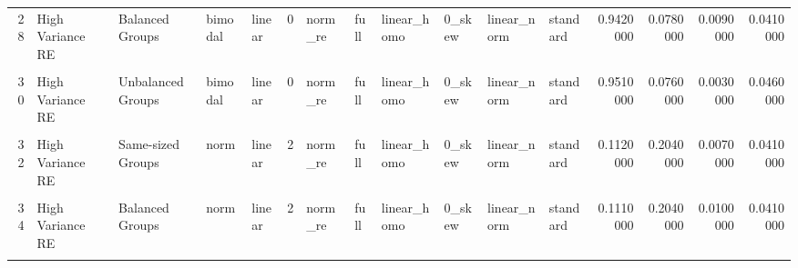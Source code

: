 \documentclass[12pt]{article}
\begin{document}
\begin{table}
{\begin{tabular}[t]{rllllrllllllrrrr}
28 & High Variance RE & Balanced Groups & bimodal & linear & 0 & norm\_re & full & linear\_homo & 0\_skew & linear\_norm & standard & 0.9420000 & 0.0780000 & 0.0090000 & 0.0410000\\
\cellcolor{gray!6}{29} & \cellcolor{gray!6}{High Variance Error} & \cellcolor{gray!6}{Unbalanced Groups} & \cellcolor{gray!6}{bimodal} & \cellcolor{gray!6}{linear} & \cellcolor{gray!6}{0} & \cellcolor{gray!6}{norm\_re} & \cellcolor{gray!6}{full} & \cellcolor{gray!6}{linear\_homo} & \cellcolor{gray!6}{0\_skew} & \cellcolor{gray!6}{linear\_norm} & \cellcolor{gray!6}{standard} & \cellcolor{gray!6}{0.0470000} & \cellcolor{gray!6}{0.0970000} & \cellcolor{gray!6}{0.0950000} & \cellcolor{gray!6}{0.0510000}\\
30 & High Variance RE & Unbalanced Groups & bimodal & linear & 0 & norm\_re & full & linear\_homo & 0\_skew & linear\_norm & standard & 0.9510000 & 0.0760000 & 0.0030000 & 0.0460000\\
\addlinespace
\cellcolor{gray!6}{31} & \cellcolor{gray!6}{High Variance Error} & \cellcolor{gray!6}{Same-sized Groups} & \cellcolor{gray!6}{norm} & \cellcolor{gray!6}{linear} & \cellcolor{gray!6}{2} & \cellcolor{gray!6}{norm\_re} & \cellcolor{gray!6}{full} & \cellcolor{gray!6}{linear\_homo} & \cellcolor{gray!6}{0\_skew} & \cellcolor{gray!6}{linear\_norm} & \cellcolor{gray!6}{standard} & \cellcolor{gray!6}{0.0550000} & \cellcolor{gray!6}{0.1170000} & \cellcolor{gray!6}{0.1510000} & \cellcolor{gray!6}{0.0530000}\\
32 & High Variance RE & Same-sized Groups & norm & linear & 2 & norm\_re & full & linear\_homo & 0\_skew & linear\_norm & standard & 0.1120000 & 0.2040000 & 0.0070000 & 0.0410000\\
\cellcolor{gray!6}{33} & \cellcolor{gray!6}{High Variance Error} & \cellcolor{gray!6}{Balanced Groups} & \cellcolor{gray!6}{norm} & \cellcolor{gray!6}{linear} & \cellcolor{gray!6}{2} & \cellcolor{gray!6}{norm\_re} & \cellcolor{gray!6}{full} & \cellcolor{gray!6}{linear\_homo} & \cellcolor{gray!6}{0\_skew} & \cellcolor{gray!6}{linear\_norm} & \cellcolor{gray!6}{standard} & \cellcolor{gray!6}{0.0510000} & \cellcolor{gray!6}{0.1100000} & \cellcolor{gray!6}{0.1360000} & \cellcolor{gray!6}{0.0500000}\\
34 & High Variance RE & Balanced Groups & norm & linear & 2 & norm\_re & full & linear\_homo & 0\_skew & linear\_norm & standard & 0.1110000 & 0.2040000 & 0.0100000 & 0.0410000\\
\cellcolor{gray!6}{35} & \cellcolor{gray!6}{High Variance Error} & \cellcolor{gray!6}{Unbalanced Groups} & \cellcolor{gray!6}{norm} & \cellcolor{gray!6}{linear} & \cellcolor{gray!6}{2} & \cellcolor{gray!6}{norm\_re} & \cellcolor{gray!6}{full} & \cellcolor{gray!6}{linear\_homo} & \cellcolor{gray!6}{0\_skew} & \cellcolor{gray!6}{linear\_norm} & \cellcolor{gray!6}{standard} & \cellcolor{gray!6}{0.0550000} & \cellcolor{gray!6}{0.1150000} & \cellcolor{gray!6}{0.1340000} & \cellcolor{gray!6}{0.0410000}\\

\end{tabular}}
\end{table}
\end{document}
